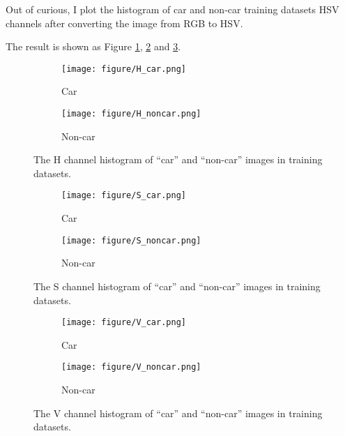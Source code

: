 \documentclass{article}[12pt]
\begin{document}
Out of curious, I plot the histogram of car and non-car training datasets HSV channels after converting
the image from RGB to HSV. 

The result is shown as Figure \ref{fig:hsv_h}, \ref{fig:hsv_s} and \ref{fig:hsv_v}.

\begin{figure}[H]
    \centering
    \begin{subfigure}[b]{0.45\textwidth}
        \centering
        \texttt{[image: figure/H\_car.png]}
        \caption{Car}
    \end{subfigure}
    \hfill
    \begin{subfigure}[b]{0.45\textwidth}
        \centering
        \texttt{[image: figure/H\_noncar.png]}
        \caption{Non-car}
    \end{subfigure}
    \caption{The H channel histogram of ``car'' and ``non-car'' images in training datasets.}
    \label{fig:hsv_h}
\end{figure}

\begin{figure}[H]
    \centering
    \begin{subfigure}[b]{0.45\textwidth}
        \centering
        \texttt{[image: figure/S\_car.png]}
        \caption{Car}
    \end{subfigure}
    \hfill
    \begin{subfigure}[b]{0.45\textwidth}
        \centering
        \texttt{[image: figure/S\_noncar.png]}
        \caption{Non-car}
    \end{subfigure}
    \caption{The S channel histogram of ``car'' and ``non-car'' images in training datasets.}
    \label{fig:hsv_s}
\end{figure}

\begin{figure}[H]
    \centering
    \begin{subfigure}[b]{0.45\textwidth}
        \centering
        \texttt{[image: figure/V\_car.png]}
        \caption{Car}
    \end{subfigure}
    \hfill
    \begin{subfigure}[b]{0.45\textwidth}
        \centering
        \texttt{[image: figure/V\_noncar.png]}
        \caption{Non-car}
    \end{subfigure}
    \caption{The V channel histogram of ``car'' and ``non-car'' images in training datasets.}
    \label{fig:hsv_v}
\end{figure}
\end{document}
